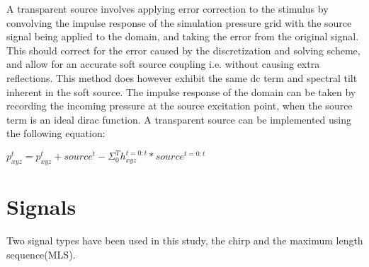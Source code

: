 A transparent source involves applying error correction to the stimulus by convolving the impulse response of the simulation pressure grid with the source signal being applied to the domain, and taking the error from the original signal. This should correct for the error caused by the discretization and solving scheme, and allow for an accurate soft source coupling i.e. without causing extra reflections. This method does however exhibit the same dc term and spectral tilt inherent in the soft source. The impulse response of the domain can be taken by recording the incoming pressure at the source excitation point, when the source term is an ideal dirac function. A transparent source can be implemented using the following equation:\\
\begin{center}
$p_{xyz}^{t} = p_{xyz}^{t} + source^{t} - \Sigma_0^T h_{xyz}^{t = 0 : t}*source^{t = 0 : t}$
\end{center}

\section{Signals}
Two signal types have been used in this study, the chirp and the maximum length sequence(MLS). 

%

